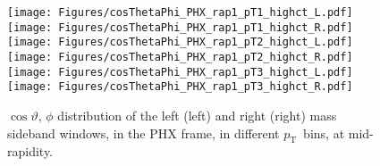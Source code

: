 \documentclass[12pt]{article}
\newcommand{\pt}{$p_{\mathrm{T}}$}
\begin{document}
%
%
%

\begin{figure}[htbp]
\centering
\texttt{[image: Figures/cosThetaPhi\_PHX\_rap1\_pT1\_highct\_L.pdf]}
\texttt{[image: Figures/cosThetaPhi\_PHX\_rap1\_pT1\_highct\_R.pdf]}
\texttt{[image: Figures/cosThetaPhi\_PHX\_rap1\_pT2\_highct\_L.pdf]}
\texttt{[image: Figures/cosThetaPhi\_PHX\_rap1\_pT2\_highct\_R.pdf]}
\texttt{[image: Figures/cosThetaPhi\_PHX\_rap1\_pT3\_highct\_L.pdf]}
\texttt{[image: Figures/cosThetaPhi\_PHX\_rap1\_pT3\_highct\_R.pdf]}
\caption{$\cos\vartheta,\,\phi$ distribution of the left (left) and
  right (right) mass sideband windows, in the PHX frame, in different
  \pt\ bins, at mid-rapidity.}
\end{figure}
\clearpage
\end{document}
